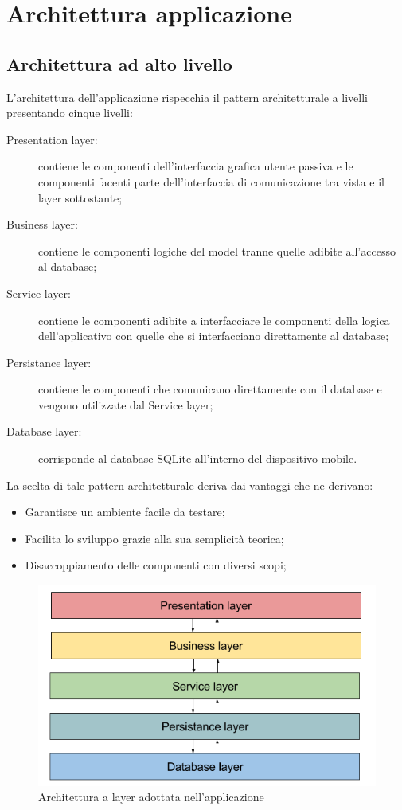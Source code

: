 \documentclass[../DefinizioneDiProdotto.tex,lanscape]{subfiles}
\begin{document}
\section{Architettura applicazione}

	\subsection{Architettura ad alto livello}
		L'architettura dell'applicazione rispecchia il pattern architetturale a livelli presentando cinque livelli:
		\begin{description}
			\item[Presentation layer:] contiene le componenti dell'interfaccia grafica utente passiva e le componenti facenti parte dell'interfaccia di comunicazione tra vista e il layer sottostante;
			\item[Business layer:] contiene le componenti logiche del model tranne quelle adibite all'accesso al database;
			\item[Service layer:] contiene le componenti adibite a interfacciare le componenti della logica dell'applicativo con quelle che si interfacciano direttamente al database;
			\item[Persistance layer:] contiene le componenti che comunicano direttamente con il database e vengono utilizzate dal Service layer; 
			\item[Database layer:] corrisponde al database SQLite all'interno del dispositivo mobile.
		\end{description}
	La scelta di tale pattern architetturale deriva dai vantaggi che ne derivano:
	\begin{itemize}
		\item Garantisce un ambiente facile da testare;
		\item Facilita lo sviluppo grazie alla sua semplicità teorica;
		\item Disaccoppiamento delle componenti con diversi scopi;
	\end{itemize}
	
	\begin{figure} [h]
		\centering
		\includegraphics[scale=0.4]{img/LayeredArchitecture}
		\caption{Architettura a layer adottata nell'applicazione}
		\label{fig:LayerArchitecture}
	\end{figure}
\end{document}
